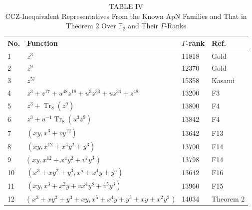 \documentclass[10pt]{article}
\begin{document}
\begin{table}[h]
\begin{center}
\captionsetup{labelformat=empty}
\caption{TABLE IV\\
CCZ-Inequivalent Representatives From the Known ApN Families and That in Theorem 2 Over $\mathbb{F}_{2}$ and Their $\Gamma$-Ranks}
\begin{tabular}{|l|l|l|l|}
\hline
No. & Function & $\Gamma$-rank & Ref. \\
\hline
1 & $z^{3}$ & 11818 & Gold \\
\hline
2 & $z^{9}$ & 12370 & Gold \\
\hline
3 & $z^{57}$ & 15358 & Kasami \\
\hline
4 & $z^{3}+z^{17}+u^{48} z^{18}+u^{3} z^{33}+u z^{34}+z^{48}$ & 13200 & F3 \\
\hline
5 & $z^{3}+\operatorname{Tr}_{8}\left(z^{9}\right)$ & 13800 & F4 \\
\hline
6 & $z^{3}+u^{-1} \operatorname{Tr}_{8}\left(u^{3} z^{9}\right)$ & 13842 & F4 \\
\hline
7 & $\left(x y, x^{3}+v y^{12}\right)$ & 13642 & F13 \\
\hline
8 & $\left(x y, x^{12}+x^{4} y^{2}+y^{3}\right)$ & 13700 & F14 \\
\hline
9 & ( $x y, x^{12}+x^{4} y^{2}+v^{7} y^{3}$ ) & 13798 & F14 \\
\hline
10 & $\left(x^{3}+x y^{2}+y^{3}, x^{5}+x^{4} y+y^{5}\right)$ & 13642 & F16 \\
\hline
11 & $\left(x y, x^{3}+x^{2} y+v x^{4} y^{8}+v^{5} y^{3}\right)$ & 13960 & F15 \\
\hline
12 & ( $x^{3}+x y^{2}+y^{3}+x y, x^{5}+x^{4} y+y^{5}+x y+x^{2} y^{2}$ ) & 14034 & Theorem 2 \\
\hline
\end{tabular}
\end{center}
\end{table}
\end{document}
